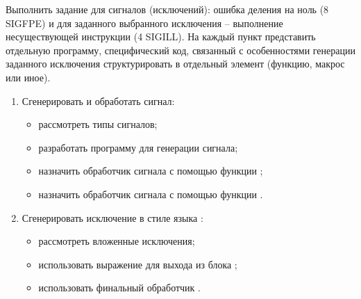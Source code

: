 \renewcommand{\labelenumii}{\theenumii}
\renewcommand{\theenumii}{\theenumi.\arabic{enumii}.}

Выполнить задание для сигналов (исключений): ошибка деления на ноль (8 SIGFPE) и для заданного выбранного исключения -- выполнение несуществующей инструкции (4 SIGILL). На каждый пункт представить отдельную программу, специфический код, связанный с особенностями генерации заданного исключения структурировать в отдельный элемент (функцию, макрос или иное).

\begin{enumerate}
	\item Сгенерировать и обработать сигнал:
	\begin{itemize}
		\item рассмотреть типы сигналов;
		\item разработать программу для генерации сигнала;
		\item назначить обработчик сигнала с помощью функции ;
		\item назначить обработчик сигнала с помощью функции .
	\end{itemize}
	\item Сгенерировать исключение в стиле языка :
	\begin{itemize}
		\item рассмотреть вложенные исключения;
		\item использовать выражение  для выхода из блока ;
		\item использовать финальный обработчик .
	\end{itemize}
\end{enumerate}
